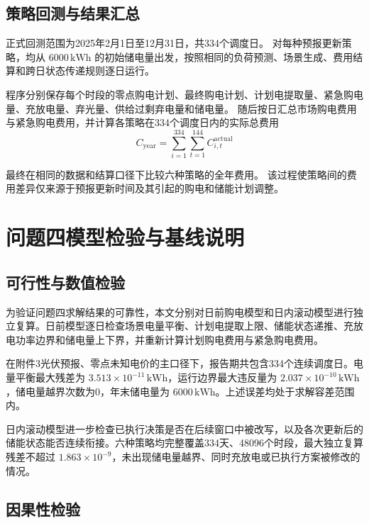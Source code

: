 \subsection{策略回测与结果汇总}

正式回测范围为2025年2月1日至12月31日，共334个调度日。
对每种预报更新策略，均从
\(6000\,\mathrm{kWh}\) 的初始储电量出发，按照相同的负荷预测、场景生成、费用结算和跨日状态传递规则逐日运行。

程序分别保存每个时段的零点购电计划、最终购电计划、计划电提取量、紧急购电量、充放电量、弃光量、供给过剩弃电量和储电量。
随后按日汇总市场购电费用与紧急购电费用，并计算各策略在334个调度日内的实际总费用
\begin{equation}
C_{\mathrm{year}}
=
\sum_{i=1}^{334}
\sum_{t=1}^{144}
C_{i,t}^{\mathrm{actual}}
\label{eq:app_q3_annual_cost}
\end{equation}

最终在相同的数据和结算口径下比较六种策略的全年费用。
该过程使策略间的费用差异仅来源于预报更新时间及其引起的购电和储能计划调整。

\section{问题四模型检验与基线说明}
\label{app:q4_validation_details}

\subsection{可行性与数值检验}

为验证问题四求解结果的可靠性，本文分别对日前购电模型和日内滚动模型进行独立复算。日前模型逐日检查场景电量平衡、计划电提取上限、储能状态递推、充放电功率边界和储电量上下界，并重新计算计划购电费用与紧急购电费用。

在附件3光伏预报、零点未知电价的主口径下，报告期共包含334个连续调度日。电量平衡最大残差为
\(3.513\times10^{-11}\,\mathrm{kWh}\)，运行边界最大违反量为
\(2.037\times10^{-10}\,\mathrm{kWh}\)，储电量越界次数为0，年末储电量为
\(6000\,\mathrm{kWh}\)。上述误差均处于求解容差范围内。

日内滚动模型进一步检查已执行决策是否在后续窗口中被改写，以及各次更新后的储能状态能否连续衔接。六种策略均完整覆盖334天、48096个时段，最大独立复算残差不超过
\(1.863\times10^{-9}\)，未出现储电量越界、同时充放电或已执行方案被修改的情况。

\subsection{因果性检验}

